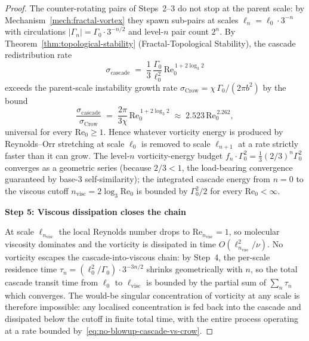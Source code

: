 \begin{proof}
The counter-rotating pairs of Steps~2--3 do not stop at the parent scale: by Mechanism~\ref{mech:fractal-vortex} they spawn sub-pairs at scales $\ell_n = \ell_0 \cdot 3^{-n}$ with circulations $|\Gamma_n| = \Gamma_0 \cdot 3^{-n/2}$ and level-$n$ pair count $2^n$. By Theorem~\ref{thm:topological-stability} (Fractal-Topological Stability), the cascade redistribution rate
\begin{equation}
\sigma_{\mathrm{cascade}} \;=\; \frac{1}{3}\,\frac{\Gamma_0}{\ell_0^2}\,\mathrm{Re}_0^{\,1+2\log_3 2}
\end{equation}
exceeds the parent-scale instability growth rate $\sigma_{\mathrm{Crow}} = \chi\,\Gamma_0/(2\pi b^2)$ by the bound
\begin{equation}\label{eq:no-blowup-cascade-vs-crow}
\frac{\sigma_{\mathrm{cascade}}}{\sigma_{\mathrm{Crow}}} \;=\; \frac{2\pi}{3\chi}\,\mathrm{Re}_0^{\,1+2\log_3 2} \;\approx\; 2.523\,\mathrm{Re}_0^{\,2.262},
\end{equation}
universal for every $\mathrm{Re}_0 \ge 1$. Hence whatever vorticity energy is produced by Reynolds--Orr stretching at scale $\ell_0$ is removed to scale $\ell_{n+1}$ at a rate strictly faster than it can grow. The level-$n$ vorticity-energy budget $f_n \cdot \Gamma_0^2 = \tfrac{1}{3}(2/3)^n \Gamma_0^2$ converges as a geometric series (because $2/3 < 1$, the load-bearing convergence guaranteed by base-$3$ self-similarity); the integrated cascade energy from $n = 0$ to the viscous cutoff $n_{\mathrm{visc}} = 2\log_3 \mathrm{Re}_0$ is bounded by $\Gamma_0^2 / 2$ for every $\mathrm{Re}_0 < \infty$.

\textbf{Step 5: Viscous dissipation closes the chain}

At scale $\ell_{n_{\mathrm{visc}}}$ the local Reynolds number drops to $\mathrm{Re}_{n_{\mathrm{visc}}} = 1$, so molecular viscosity dominates and the vorticity is dissipated in time $O(\ell_{n_{\mathrm{visc}}}^2/\nu)$. No vorticity escapes the cascade-into-viscous chain: by Step~4, the per-scale residence time $\tau_n = (\ell_0^2/\Gamma_0)\cdot 3^{-3n/2}$ shrinks geometrically with $n$, so the total cascade transit time from $\ell_0$ to $\ell_{\mathrm{visc}}$ is bounded by the partial sum of $\sum_n \tau_n$ which converges. The would-be singular concentration of vorticity at any scale is therefore impossible: any localised concentration is fed back into the cascade and dissipated below the cutoff in finite total time, with the entire process operating at a rate bounded by~\eqref{eq:no-blowup-cascade-vs-crow}.


\end{proof}
